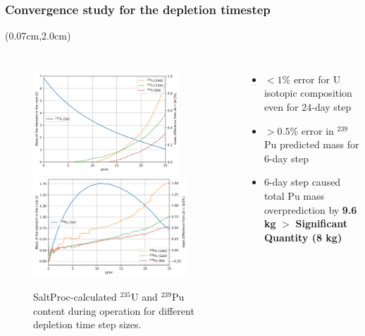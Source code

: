\documentclass[9pt]{beamer}
\begin{document}
\begin{frame}
\frametitle{Convergence study for the depletion timestep}
\begin{textblock*}{12.4cm}(0.07cm,2.0cm) %
	\begin{columns}
		\column[t]{6.1cm}
		\vspace{-6mm}
		\begin{figure}[hbp!] %
				\includegraphics[width=0.85\textwidth]{../dissertation/figures/ch4/u235_time_refinement.png}\\
				\vspace{-4mm}
				\hspace{+0.1mm}
				\includegraphics[width=0.9\textwidth]{../dissertation/figures/ch4/pu239_time_refinement.png}
				\vspace{-3mm}
				\caption{SaltProc-calculated $^{235}$U and $^{239}$Pu content 
				during operation
for different depletion time step sizes.}
		\end{figure}
		
		\column[t]{5.5cm}
			\begin{itemize}
				\item $<1$\% error for U isotopic composition even for 
				24-day step
				\item $>0.5$\% error in $^{239}$Pu predicted mass for 6-day 
				step
				\item 6-day step caused total Pu mass overprediction by 
				\textbf{9.6 kg} $>$ \textbf{Significant Quantity (8 kg)}
			\end{itemize}
		
	\end{columns}
\end{textblock*}
\end{frame}
\end{document}
